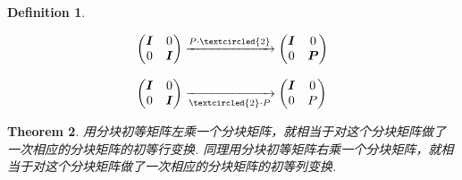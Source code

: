 \documentclass{article}
\newtheorem{theorem}{Theorem}[section]
\newtheorem{definition}[theorem]{Definition}
\newcommand{\mbf}[1]{\bm{#1}}
\begin{document}
\begin{definition}
\begin{enumerate}
$$\begin{array}{ll}
\begin{pmatrix}
	\mbf{I} & 0 \\
	0 & \mbf{I} 
	\end{pmatrix}\xrightarrow{P \cdot \tiny\textcircled{2}}
	\begin{pmatrix} 
	\mbf{I} & 0 \\
	0 & \mbf{P}
	\end{pmatrix} \\ \\
	\begin{pmatrix} 
	\mbf{I} & 0 \\
	0 & \mbf{I} 
	\end{pmatrix}\xrightarrow[\tiny\textcircled{2} \cdot P]{}
	\begin{pmatrix} 
	\mbf{I} & 0 \\
	0 & P
	\end{pmatrix}
	\end{array} 
	$$ 
\end{enumerate}
\end{definition}

\begin{theorem}
\rm 用分块初等矩阵左乘一个分块矩阵，就相当于对这个分块矩阵做了一次相应的分块矩阵的初等行变换. 同理用分块初等矩阵右乘一个分块矩阵，就相当于对这个分块矩阵做了一次相应的分块矩阵的初等列变换.
\end{theorem}
\end{document}
